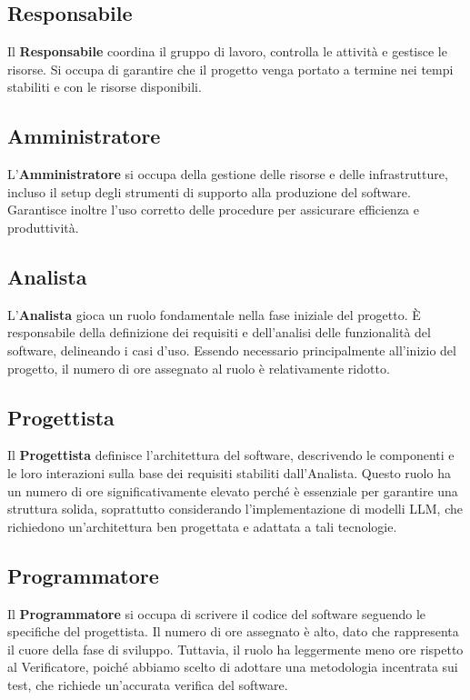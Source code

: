 \documentclass{article}
\begin{document}
\subsection{Responsabile}
Il \textbf{Responsabile} coordina il gruppo di lavoro, controlla le attività e gestisce le risorse. Si occupa di garantire che il progetto venga portato a termine nei tempi stabiliti e con le risorse disponibili.

\subsection{Amministratore}
L'\textbf{Amministratore} si occupa della gestione delle risorse e delle infrastrutture, incluso il setup degli strumenti di supporto alla produzione del software. Garantisce inoltre l’uso corretto delle procedure per assicurare efficienza e produttività.

\subsection{Analista}
L'\textbf{Analista} gioca un ruolo fondamentale nella fase iniziale del progetto. È responsabile della definizione dei requisiti e dell’analisi delle funzionalità del software, delineando i casi d'uso. Essendo necessario principalmente all'inizio del progetto, il numero di ore assegnato al ruolo è relativamente ridotto.

\subsection{Progettista}
Il \textbf{Progettista} definisce l'architettura del software, descrivendo le componenti e le loro interazioni sulla base dei requisiti stabiliti dall'Analista. Questo ruolo ha un numero di ore significativamente elevato perché è essenziale per garantire una struttura solida, soprattutto considerando l’implementazione di modelli LLM, che richiedono un'architettura ben progettata e adattata a tali tecnologie.

\subsection{Programmatore}
Il \textbf{Programmatore} si occupa di scrivere il codice del software seguendo le specifiche del progettista. Il numero di ore assegnato è alto, dato che rappresenta il cuore della fase di sviluppo. Tuttavia, il ruolo ha leggermente meno ore rispetto al Verificatore, poiché abbiamo scelto di adottare una metodologia incentrata sui test, che richiede un’accurata verifica del software.
\end{document}

